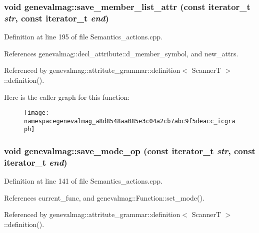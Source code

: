 \hypertarget{namespacegenevalmag_a8d8548aa085e3c04a2cb7abc9f5deacc}{
\subsubsection[{save\_\-member\_\-list\_\-attr}]{\setlength{\rightskip}{0pt plus 5cm}void genevalmag::save\_\-member\_\-list\_\-attr (const iterator\_\-t {\em str}, \/  const iterator\_\-t {\em end})}}
\label{namespacegenevalmag_a8d8548aa085e3c04a2cb7abc9f5deacc}


Definition at line 195 of file Semantics\_\-actions.cpp.



References genevalmag::decl\_\-attribute::d\_\-member\_\-symbol, and new\_\-attrs.



Referenced by genevalmag::attritute\_\-grammar::definition$<$ ScannerT $>$::definition().



Here is the caller graph for this function:\nopagebreak
\begin{figure}[H]
\begin{center}
\leavevmode
\texttt{[image: namespacegenevalmag\_a8d8548aa085e3c04a2cb7abc9f5deacc\_icgraph]}
\end{center}
\end{figure}


\hypertarget{namespacegenevalmag_a6c04408088fac02746a5a14e9b10f304}{
\subsubsection[{save\_\-mode\_\-op}]{\setlength{\rightskip}{0pt plus 5cm}void genevalmag::save\_\-mode\_\-op (const iterator\_\-t {\em str}, \/  const iterator\_\-t {\em end})}}
\label{namespacegenevalmag_a6c04408088fac02746a5a14e9b10f304}


Definition at line 141 of file Semantics\_\-actions.cpp.



References current\_\-func, and genevalmag::Function::set\_\-mode().



Referenced by genevalmag::attritute\_\-grammar::definition$<$ ScannerT $>$::definition().



